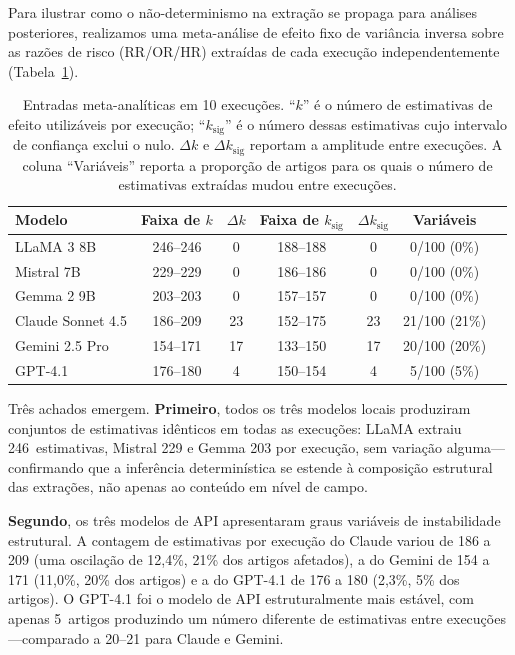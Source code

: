 \documentclass[12pt, a4paper]{article}
\begin{document}
Para ilustrar como o não-determinismo na extração se propaga para análises posteriores, realizamos uma meta-análise de efeito fixo de variância inversa sobre as razões de risco (RR/OR/HR) extraídas de cada execução independentemente (Tabela~\ref{tab:meta}).

\begin{table}[H]
\centering
\caption{Entradas meta-analíticas em 10 execuções. ``$k$'' é o número de estimativas de efeito utilizáveis por execução; ``$k_{\text{sig}}$'' é o número dessas estimativas cujo intervalo de confiança exclui o nulo. $\Delta k$ e $\Delta k_{\text{sig}}$ reportam a amplitude entre execuções. A coluna ``Variáveis'' reporta a proporção de artigos para os quais o número de estimativas extraídas mudou entre execuções.}
\label{tab:meta}
\begin{tabular}{lcccccc}
\toprule
\textbf{Modelo} & \textbf{Faixa de $k$} & \textbf{$\Delta k$} & \textbf{Faixa de $k_{\text{sig}}$} & \textbf{$\Delta k_{\text{sig}}$} & \textbf{Variáveis} \\
\midrule
LLaMA 3 8B       & 246--246 & 0  & 188--188 & 0  & 0/100 (0\%) \\
Mistral 7B        & 229--229 & 0  & 186--186 & 0  & 0/100 (0\%) \\
Gemma 2 9B        & 203--203 & 0  & 157--157 & 0  & 0/100 (0\%) \\
\midrule
Claude Sonnet 4.5 & 186--209 & 23 & 152--175 & 23 & 21/100 (21\%) \\
Gemini 2.5 Pro    & 154--171 & 17 & 133--150 & 17 & 20/100 (20\%) \\
GPT-4.1           & 176--180 & 4  & 150--154 & 4  & 5/100 (5\%) \\
\bottomrule
\end{tabular}
\end{table}

\noindent Três achados emergem.
\textbf{Primeiro}, todos os três modelos locais produziram conjuntos de estimativas idênticos em todas as execuções: LLaMA extraiu 246~estimativas, Mistral 229 e Gemma 203 por execução, sem variação alguma---confirmando que a inferência determinística se estende à composição estrutural das extrações, não apenas ao conteúdo em nível de campo.

\textbf{Segundo}, os três modelos de API apresentaram graus variáveis de instabilidade estrutural.
A contagem de estimativas por execução do Claude variou de 186 a 209 (uma oscilação de 12,4\%, 21\% dos artigos afetados), a do Gemini de 154 a 171 (11,0\%, 20\% dos artigos) e a do GPT-4.1 de 176 a 180 (2,3\%, 5\% dos artigos).
O GPT-4.1 foi o modelo de API estruturalmente mais estável, com apenas 5~artigos produzindo um número diferente de estimativas entre execuções---comparado a 20--21 para Claude e Gemini.
\end{document}
